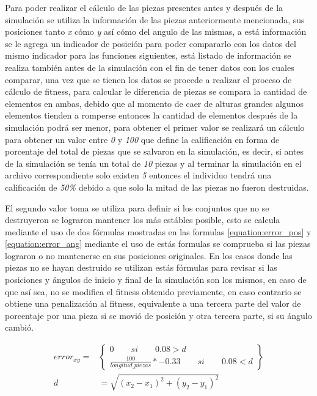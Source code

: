 Para poder realizar el cálculo de las piezas presentes antes y después de la
simulación se utiliza la información de las piezas anteriormente mencionada, sus
posiciones tanto \textit{x} cómo \textit{y} así cómo del angulo de las mismas, a
está información se le agrega un indicador de posición para poder compararlo con
los datos del mismo indicador para las funciones siguientes, está listado de
información se realiza también antes de la simulación con el fin de tener datos
con los cuales comparar, una vez que se tienen los datos se procede a realizar
el proceso de cálculo de fitness, para calcular le diferencia de piezas se
compara la cantidad de elementos en ambas, debido que al momento de caer de
alturas grandes algunos elementos tienden a romperse entonces la cantidad de
elementos después de la simulación podrá ser menor, para obtener el primer valor
se realizará un cálculo para obtener un valor entre \textit{0} y \textit{100}
que define la calificación en forma de porcentaje del total de piezas que se
salvaron en la simulación, es decir, si antes de la simulación se tenía un total
de \textit{10} piezas y al terminar la simulación en el archivo correspondiente
solo existen \textit{5} entonces el individuo tendrá una calificación de
\textit{50\%} debido a que solo la mitad de las piezas no fueron destruidas.

El segundo valor toma se utiliza para definir si los conjuntos que no se
destruyeron se lograron mantener los más estábles posible, esto se calcula
mediante el uso de dos fórmulas mostradas en las formulas
\ref{equation:error_pos} y \ref{equation:error_ang} mediante el uso de estás
formulas se comprueba si las piezas lograron o no mantenerse en sus posiciones
originales. En los casos donde las piezas no se hayan destruido se utilizan
estás fórmulas para revisar si las posiciones y ángulos de inicio y final de la
simulación son los mismos, en caso de que así sea, no se modifica el fitness
obtenido previamente, en caso contrario se obtiene una
penalización al fitness, equivalente a una tercera parte del valor de porcentaje
por una pieza si se movió de posición y otra tercera parte, si su ángulo cambió.

\begin{equation}
    \begin{split}
      error_{xy} = & 
      \begin{Bmatrix}
        0 \qquad si \qquad 0.08 > d \\ 
        \frac{100}{longitud\_piezas} * -0.33 \qquad si \qquad 0.08 < d
      \end{Bmatrix} \\
       d & = \sqrt{(x_2 - x_1)^2 + (y_2 - y_1)^2}
    \end{split}
    \label{equation:error_pos}
\end{equation}

